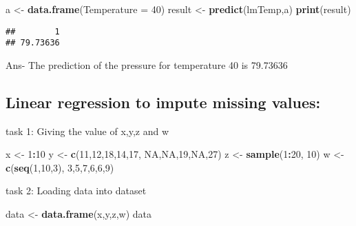 \documentclass[
]{article}
\newenvironment{Shaded}{\begin{snugshade}}{\end{snugshade}}
\newcommand{\AttributeTok}[1]{\textcolor[rgb]{0.13,0.29,0.53}{#1}}
\newcommand{\ConstantTok}[1]{\textcolor[rgb]{0.56,0.35,0.01}{#1}}
\newcommand{\DecValTok}[1]{\textcolor[rgb]{0.00,0.00,0.81}{#1}}
\newcommand{\FunctionTok}[1]{\textcolor[rgb]{0.13,0.29,0.53}{\textbf{#1}}}
\newcommand{\NormalTok}[1]{#1}
\newcommand{\OtherTok}[1]{\textcolor[rgb]{0.56,0.35,0.01}{#1}}
\newcommand{\SpecialCharTok}[1]{\textcolor[rgb]{0.81,0.36,0.00}{\textbf{#1}}}
\begin{document}
\begin{Shaded}
\begin{Highlighting}[]
\NormalTok{a }\OtherTok{\textless{}{-}} \FunctionTok{data.frame}\NormalTok{(}\AttributeTok{Temperature =} \DecValTok{40}\NormalTok{) }
\NormalTok{result }\OtherTok{\textless{}{-}} \FunctionTok{predict}\NormalTok{(lmTemp,a) }
\FunctionTok{print}\NormalTok{(result)}
\end{Highlighting}
\end{Shaded}

\begin{verbatim}
##        1 
## 79.73636
\end{verbatim}

Ans- The prediction of the pressure for temperature 40 is 79.73636

\hypertarget{linear-regression-to-impute-missing-values}{%
\subsection{Linear regression to impute missing
values:}\label{linear-regression-to-impute-missing-values}}

task 1: Giving the value of x,y,z and w

\begin{Shaded}
\begin{Highlighting}[]
\NormalTok{x }\OtherTok{\textless{}{-}} \DecValTok{1}\SpecialCharTok{:}\DecValTok{10} 
\NormalTok{y }\OtherTok{\textless{}{-}} \FunctionTok{c}\NormalTok{(}\DecValTok{11}\NormalTok{,}\DecValTok{12}\NormalTok{,}\DecValTok{18}\NormalTok{,}\DecValTok{14}\NormalTok{,}\DecValTok{17}\NormalTok{, }\ConstantTok{NA}\NormalTok{,}\ConstantTok{NA}\NormalTok{,}\DecValTok{19}\NormalTok{,}\ConstantTok{NA}\NormalTok{,}\DecValTok{27}\NormalTok{) }
\NormalTok{z }\OtherTok{\textless{}{-}} \FunctionTok{sample}\NormalTok{(}\DecValTok{1}\SpecialCharTok{:}\DecValTok{20}\NormalTok{, }\DecValTok{10}\NormalTok{) }
\NormalTok{w }\OtherTok{\textless{}{-}} \FunctionTok{c}\NormalTok{(}\FunctionTok{seq}\NormalTok{(}\DecValTok{1}\NormalTok{,}\DecValTok{10}\NormalTok{,}\DecValTok{3}\NormalTok{), }\DecValTok{3}\NormalTok{,}\DecValTok{5}\NormalTok{,}\DecValTok{7}\NormalTok{,}\DecValTok{6}\NormalTok{,}\DecValTok{6}\NormalTok{,}\DecValTok{9}\NormalTok{) }
\end{Highlighting}
\end{Shaded}

task 2: Loading data into dataset

\begin{Shaded}
\begin{Highlighting}[]
\NormalTok{data }\OtherTok{\textless{}{-}} \FunctionTok{data.frame}\NormalTok{(x,y,z,w) }
\NormalTok{data }
\end{Highlighting}
\end{Shaded}
\end{document}
